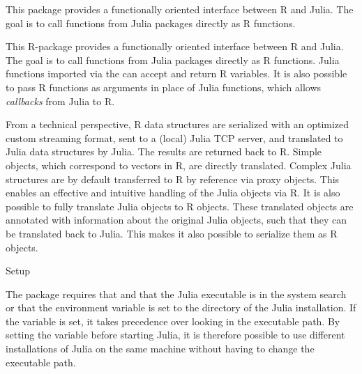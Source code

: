%
\begin{Description}\relax
This package provides a functionally oriented interface between R and Julia.
The goal is to call functions from Julia packages directly as R functions.
\end{Description}
%
\begin{Details}\relax
This R-package provides a functionally oriented interface between R and Julia.
The goal is to call functions from Julia packages directly as R functions.
Julia functions imported via the  can accept and return R variables.
It is also possible to pass R functions as arguments in place of Julia functions,
which allows \emph{callbacks} from Julia to R.

From a technical perspective, R data structures are serialized with an optimized custom streaming format,
sent to a (local) Julia TCP server, and translated to Julia data structures by Julia.
The results are returned back to R.
Simple objects, which correspond to vectors in R, are directly translated.
Complex Julia structures are by default transferred to R by reference via proxy objects.
This enables an effective and intuitive handling of the Julia objects via R.
It is also possible to fully translate Julia objects to R objects.
These translated objects are annotated with information
about the original Julia objects, such that they can be translated back to Julia.
This makes it also possible to serialize them as R objects.
\end{Details}
%
\begin{Section}{Setup}

The package requires that
and that the Julia executable is in the system search  or that the
 environment variable is set to the  directory of
the Julia installation.
If the  variable is set, it takes precedence over
looking in the executable path.
By setting the  variable before starting Julia,
it is therefore possible to use different installations of Julia on the
same machine without having to change the executable path.
\end{Section}
%
